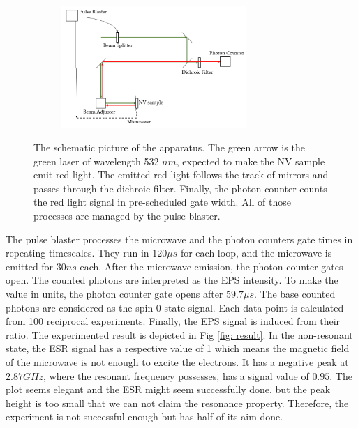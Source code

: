 \documentclass{article}
\begin{document}
\begin{figure}[ht]
    \centering
    \begin{subfigure}[b]{7cm}
        \centering
        \includegraphics[width=7cm]{./figs/apparatus.png}
    \end{subfigure}
    \hfill
    \caption{
        The schematic picture of the apparatus.
        The green arrow is the green laser of wavelength 532 $nm$, expected to make the NV sample emit red light.
        The emitted red light follows the track of mirrors and passes through the dichroic filter.
        Finally, the photon counter counts the red light signal in pre-scheduled gate width.
        All of those processes are managed by the pulse blaster.
    }
    \label{fig: apparatus}
\end{figure}

The pulse blaster processes the microwave and the photon counters gate times in repeating timescales.
They run in $120\mu s$ for each loop, and the microwave is emitted for $30 ns$ each.
After the microwave emission, the photon counter gates open.
The counted photons are interpreted as the EPS intensity.
To make the value in units, the photon counter gate opens after $59.7 \mu s$.
The base counted photons are considered as the spin 0 state signal.
Each data point is calculated from 100 reciprocal experiments.
Finally, the EPS signal is induced from their ratio.
The experimented result is depicted in Fig \ref{fig: result}.
In the non-resonant state, the ESR signal has a respective value of 1 which means the magnetic field of the microwave is not enough to excite the electrons.
It has a negative peak at $2.87GHz$, where the resonant frequency possesses, has a signal value of $0.95$.
The plot seems elegant and the ESR might seem successfully done, but the peak height is too small that we can not claim the resonance property.
Therefore, the experiment is not successful enough but has half of its aim done.
\end{document}
